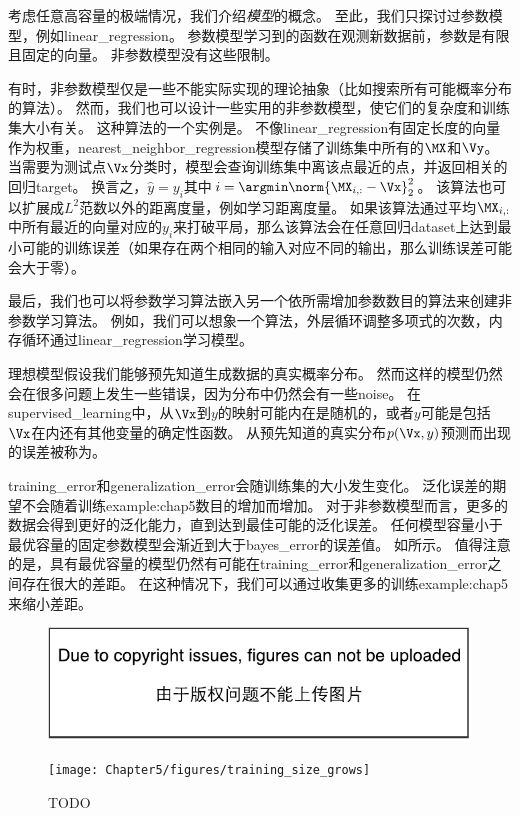 
考虑任意高容量的极端情况，我们介绍\emph{模型}的概念。
至此，我们只探讨过参数模型，例如\gls{linear_regression}。
参数模型学习到的函数在观测新数据前，参数是有限且固定的向量。
非参数模型没有这些限制。

有时，非参数模型仅是一些不能实际实现的理论抽象（比如搜索所有可能概率分布的算法）。
然而，我们也可以设计一些实用的非参数模型，使它们的复杂度和训练集大小有关。
这种算法的一个实例是。
不像\gls{linear_regression}有固定长度的向量作为权重，\gls{nearest_neighbor_regression}模型存储了训练集中所有的$\MX$和$\Vy$。
当需要为测试点$\Vx$分类时，模型会查询训练集中离该点最近的点，并返回相关的回归\gls{target}。
换言之，$\hat{y}=y_i$其中$i=\argmin \norm{\MX_{i,:}-\Vx}_2^2$。
该算法也可以扩展成$L^2$范数以外的距离度量，例如学习距离度量\citep{RoweisNCA2005}。
如果该算法通过平均$\MX_{i,:}$中所有最近的向量对应的$y_i$来打破平局，那么该算法会在任意回归\gls{dataset}上达到最小可能的训练误差（如果存在两个相同的输入对应不同的输出，那么训练误差可能会大于零）。

最后，我们也可以将参数学习算法嵌入另一个依所需增加参数数目的算法来创建非参数学习算法。
例如，我们可以想象一个算法，外层循环调整多项式的次数，内存循环通过\gls{linear_regression}学习模型。


理想模型假设我们能够预先知道生成数据的真实概率分布。
然而这样的模型仍然会在很多问题上发生一些错误，因为分布中仍然会有一些\gls{noise}。
在\gls{supervised_learning}中，从$\Vx$到$y$的映射可能内在是随机的，或者$y$可能是包括$\Vx$在内还有其他变量的确定性函数。
从预先知道的真实分布$p(\Vx,y)$预测而出现的误差被称为。

\gls{training_error}和\gls{generalization_error}会随训练集的大小发生变化。
泛化误差的期望不会随着训练\gls{example:chap5}数目的增加而增加。
对于非参数模型而言，更多的数据会得到更好的泛化能力，直到达到最佳可能的泛化误差。
任何模型容量小于最优容量的固定参数模型会渐近到大于\gls{bayes_error}的误差值。
如所示。
值得注意的是，具有最优容量的模型仍然有可能在\gls{training_error}和\gls{generalization_error}之间存在很大的差距。
在这种情况下，我们可以通过收集更多的训练\gls{example:chap5}来缩小差距。

\begin{figure}[!htb]
\ifOpenSource
\centerline{\includegraphics{figure.pdf}}
\else
\centerline{\texttt{[image: Chapter5/figures/training\_size\_grows]}}
\fi
\caption{TODO}
\label{fig:chap5_training_size_grows}
\end{figure}

